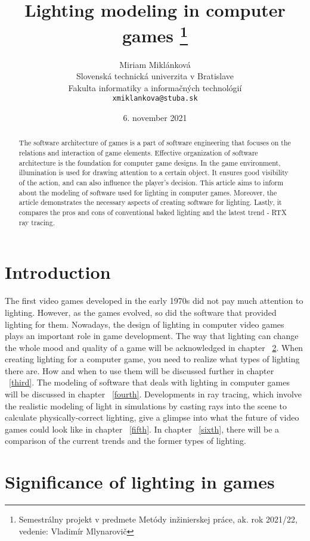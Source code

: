 \documentclass[10pt,twoside,english,a4paper]{article}
\title{Lighting modeling in computer games
\thanks{Semestrálny projekt v predmete Metódy inžinierskej práce, ak. rok 2021/22, vedenie: Vladimír Mlynarovič}}
\author{Miriam Miklánková\\[2pt]
	{\small Slovenská technická univerzita v Bratislave}\\
	{\small Fakulta informatiky a informačných technológií}\\
	{\small \texttt{xmiklankova@stuba.sk}}
	}
\date{\small 6. november 2021}
\begin{document}
\maketitle

\begin{abstract}
The software architecture of games is a part of software engineering that focuses on the relations and interaction of game elements. Effective organization of software architecture is the foundation for computer game designs. In the game environment, illumination is used for drawing attention to a certain object. It ensures good visibility of the action, and can also influence the player's decision. This article aims to inform about the modeling of software used for lighting in computer games. Moreover, the article demonstrates the necessary aspects of creating software for lighting. Lastly, it compares the pros and cons of conventional baked lighting and the latest trend - RTX ray tracing.
\end{abstract}


\section{Introduction}
The first video games developed in the early 1970s did not pay much attention to lighting. However, as the games evolved, so did the software that provided lighting for them. Nowadays, the design of lighting in computer video games plays an important role in game development. The way that lighting can change the whole mood and quality of a game will be acknowledged in chapter ~\ref{second}. When creating lighting for a computer game, you need to realize what types of lighting there are. How and when to use them will be discussed further in chapter ~\ref{third}. The modeling of software that deals with lighting in computer games will be discussed in chapter ~\ref{fourth}.  Developments in ray tracing, which involve the realistic modeling of light in simulations by casting rays into the scene to calculate physically-correct lighting, give a glimpse into what the future of video games could look like \cite{Foundry-Article} in chapter ~\ref{fifth}. In chapter ~\ref{sixth}, there will be a comparison of the current trends and the former types of lighting. 


\section{Significance of lighting in games} \label{second}
\end{document}
